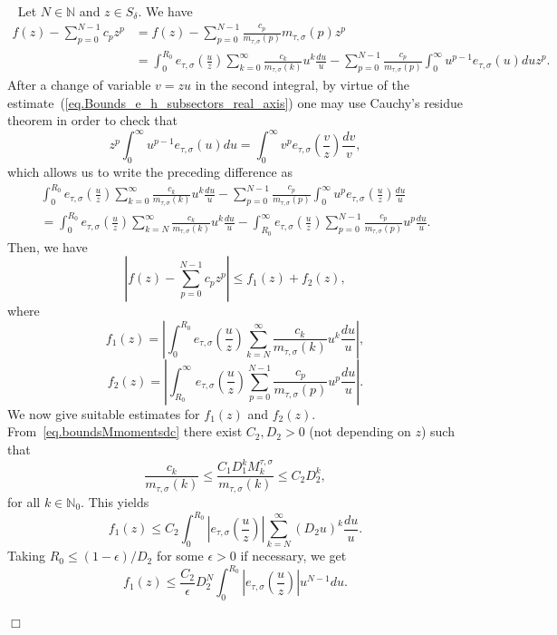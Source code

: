 \documentclass[12pt,leqno]{amsart}
\def\N{\mathbb{N}}
\theoremstyle{plain}
\theoremstyle{definition}
\numberwithin{equation}{section}
\newenvironment{proof1}{\medskip\par\noindent{\bf Proof}\ \normalfont}{\hfill $\Box$
\medskip\par}
\begin{document}
\begin{proof1}
Let $N\in\N$ and $z\in S_{\delta}$. We have 
\begin{align*}
f(z)-\sum_{p=0}^{N-1} c_p z^p &= f(z)-\sum_{p=0}^{N-1}\frac{c_p}{m_{\tau,\sigma}(p)} m_{\tau,\sigma}(p)z^p\\
&= \int_{0}^{R_0}e_{\tau,\sigma}\left(\frac{u}{z}\right) \sum_{k=0}^{\infty}\frac{c_{k}}{m_{\tau,\sigma}(k)} u^k \frac{du}{u} -\sum_{p=0}^{N-1}\frac{c_p}{m_{\tau,\sigma}(p)}\int_{0}^{\infty}u^{p-1}e_{\tau,\sigma}(u)du z^p.
\end{align*}
After a change of variable $v=zu$ in the second integral, by virtue of the estimate~(\ref{eq.Bounds_e_h_subsectors_real_axis}) one may use Cauchy's residue theorem in order to check that
$$
z^p\int_{0}^{\infty}u^{p-1}e_{\tau,\sigma}(u)du= \int_{0}^{\infty}v^{p}e_{\tau,\sigma}\left(\frac{v}{z}\right)\frac{dv}{v},
$$
which allows us to write the preceding difference as 
\begin{multline*}
\int_{0}^{R_0}e_{\tau,\sigma}\left(\frac{u}{z}\right) \sum_{k=0}^{\infty}\frac{c_{k}}{m_{\tau,\sigma}(k)} u^k \frac{du}{u} -\sum_{p=0}^{N-1}\frac{c_p}{m_{\tau,\sigma}(p)} \int_{0}^{\infty}u^{p}e_{\tau,\sigma}\left(\frac{u}{z}\right) \frac{du}{u} \\
=\int_{0}^{R_0}e_{\tau,\sigma}\left(\frac{u}{z}\right) \sum_{k=N}^{\infty}\frac{c_{k}}{m_{\tau,\sigma}(k)} u^k\frac{du}{u} -\int_{R_0}^{\infty}e_{\tau,\sigma}\left(\frac{u}{z}\right) \sum_{p=0}^{N-1}\frac{c_p}{m_{\tau,\sigma}(p)} u^{p}\frac{du}{u}.
\end{multline*} 
Then, we have 
$$\left|f(z)-\sum_{p=0}^{N-1} c_p z^p\right|\le f_{1}(z)+f_2(z),$$
where 
$$f_{1}(z)=\left|\int_{0}^{R_0}e_{\tau,\sigma}\left(\frac{u}{z}\right) \sum_{k=N}^{\infty}\frac{c_{k}}{m_{\tau,\sigma}(k)} u^k \frac{du}{u}\right|,$$
$$f_{2}(z)=\left|\int_{R_0}^{\infty}e_{\tau,\sigma}\left(\frac{u}{z}\right) \sum_{p=0}^{N-1}\frac{c_p}{m_{\tau,\sigma}(p)} u^{p}\frac{du}{u}\right|.$$
We now give suitable estimates for $f_1(z)$ and $f_2(z)$.
From~\eqref{eq.boundsMmomentsdc} there exist $C_2,D_2>0$ (not depending on $z$) such that 
\begin{equation}\label{e327}
\frac{c_{k}}{m_{\tau,\sigma}(k)}\le \frac{C_1D_1^{k} M^{\tau,\sigma}_k}{m_{\tau,\sigma}(k)}\le C_2D_2^k,
\end{equation}
for all $k\in\N_0$. This yields
$$f_{1}(z)\le C_2\int_{0}^{R_0}\left|e_{\tau,\sigma}\left(\frac{u}{z}\right)\right| \sum_{k=N}^{\infty}(D_2u)^{k}\frac{du}{u}.$$
Taking $R_0\le(1-\epsilon)/D_2$ for some $\epsilon>0$ if necessary, we get
$$f_1(z)\le\frac{C_2}{\epsilon}D_2^{N}\int_{0}^{R_0} \left|e_{\tau,\sigma}\left(\frac{u}{z}\right)\right|u^{N-1}du.$$




\end{proof1}
\end{document}
